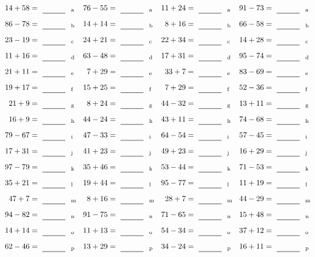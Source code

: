 \documentclass
[
  draft    = true,
  fontsize = 11pt,
  parskip  = half-
]
{scrartcl}
\begin{document}
\clearpage
\begin{align*}
    \pline{14+58}&=\rline{a}
  & \pline{76-55}&=\rline{a}
  & \pline{11+24}&=\rline{a}
  & \pline{91-73}&=\rline{a} \\[1ex]
    \pline{86-78}&=\rline{b}
  & \pline{14+14}&=\rline{b}
  & \pline{8+16}&=\rline{b}
  & \pline{66-58}&=\rline{b} \\[1ex]
    \pline{23-19}&=\rline{c}
  & \pline{24+21}&=\rline{c}
  & \pline{22+34}&=\rline{c}
  & \pline{14+28}&=\rline{c} \\[1ex]
    \pline{11+16}&=\rline{d}
  & \pline{63-48}&=\rline{d}
  & \pline{17+31}&=\rline{d}
  & \pline{95-74}&=\rline{d} \\[1ex]
    \pline{21+11}&=\rline{e}
  & \pline{7+29}&=\rline{e}
  & \pline{33+7}&=\rline{e}
  & \pline{83-69}&=\rline{e} \\[1ex]
    \pline{19+17}&=\rline{f}
  & \pline{15+25}&=\rline{f}
  & \pline{7+29}&=\rline{f}
  & \pline{52-36}&=\rline{f} \\[1ex]
    \pline{21+9}&=\rline{g}
  & \pline{8+24}&=\rline{g}
  & \pline{44-32}&=\rline{g}
  & \pline{13+11}&=\rline{g} \\[1ex]
    \pline{16+9}&=\rline{h}
  & \pline{44-24}&=\rline{h}
  & \pline{43+11}&=\rline{h}
  & \pline{74-68}&=\rline{h} \\[1ex]
    \pline{79-67}&=\rline{i}
  & \pline{47-33}&=\rline{i}
  & \pline{64-54}&=\rline{i}
  & \pline{57-45}&=\rline{i} \\[1ex]
    \pline{17+31}&=\rline{j}
  & \pline{41+23}&=\rline{j}
  & \pline{49+23}&=\rline{j}
  & \pline{16+29}&=\rline{j} \\[1ex]
    \pline{97-79}&=\rline{k}
  & \pline{35+46}&=\rline{k}
  & \pline{53-44}&=\rline{k}
  & \pline{71-53}&=\rline{k} \\[1ex]
    \pline{35+21}&=\rline{l}
  & \pline{19+44}&=\rline{l}
  & \pline{95-77}&=\rline{l}
  & \pline{11+19}&=\rline{l} \\[1ex]
    \pline{47+7}&=\rline{m}
  & \pline{8+16}&=\rline{m}
  & \pline{28+7}&=\rline{m}
  & \pline{44-29}&=\rline{m} \\[1ex]
    \pline{94-82}&=\rline{n}
  & \pline{91-75}&=\rline{n}
  & \pline{71-65}&=\rline{n}
  & \pline{15+48}&=\rline{n} \\[1ex]
    \pline{14+14}&=\rline{o}
  & \pline{11+13}&=\rline{o}
  & \pline{54-34}&=\rline{o}
  & \pline{37+12}&=\rline{o} \\[1ex]
    \pline{62-46}&=\rline{p}
  & \pline{13+29}&=\rline{p}
  & \pline{34-24}&=\rline{p}
  & \pline{16+11}&=\rline{p}
\end{align*}
\end{document}
